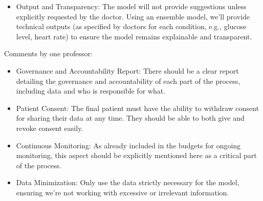 \begin{itemize}
    \item Output and Transparency: The model will not provide suggestions unless explicitly requested by the doctor.
    Using an ensemble model, we’ll provide technical outputs (as specified by doctors for each condition,
    e.g., glucose level, heart rate) to ensure the model remains explainable and transparent.

\end{itemize}

Comments by one professor:
\begin{itemize}
    \item Governance and Accountability Report: There should be a clear report detailing the governance and accountability of each part of the process, including data and who is responsible for what.


    \item Patient Consent: The final patient must have the ability to withdraw consent for sharing their data at any time. They should be able to both give and revoke consent easily.


    \item Continuous Monitoring: As already included in the budgets for ongoing monitoring, this aspect should be explicitly mentioned here as a critical part of the process.


    \item Data Minimization: Only use the data strictly necessary for the model, ensuring we’re not working with excessive or irrelevant information.


\end{itemize}

